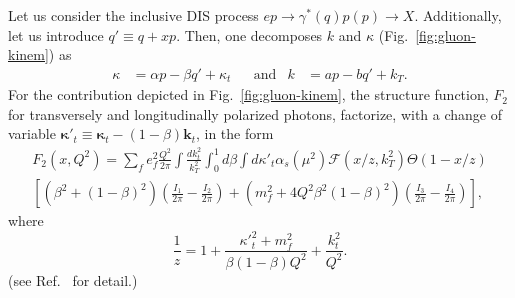 \documentclass[12pt]{article}
\numberwithin{equation}{section}
\numberwithin{table}{section}
\numberwithin{figure}{section}
\begin{document}
Let us consider the inclusive DIS process $e p\rightarrow \gamma^* (q) p(p)\rightarrow X$. %
Additionally, let us introduce $q'\equiv q+x p$. 
Then, one  decomposes $k$ and $\kappa$ (Fig.~\ref{fig:gluon-kinem}) as
\begin{align}
    \kappa&=\alpha p-\beta q'+\kappa_t&&\mathrm{and}& k&=a p- bq'+k_T.
\end{align}
For the contribution depicted in Fig.~\ref{fig:gluon-kinem}, the structure function, $F_2$ for transversely and longitudinally polarized photons, factorize, with a change of variable  ${\boldsymbol{\kappa}'}_t\equiv{\boldsymbol{\kappa}_t}-(1-\beta)\mathbf{k}_t$, in the form~\cite{ Kimber:2001uaa,Kwiecinski:1997ee}
\begin{multline}
	F_2(x,Q^2)=\sum_f e_f^2 \frac{Q^2}{2\pi}\int\frac{dk^2_t}{k_T^2}\int^1_0d\beta\int d{\kappa'}_t\alpha_s(\mu^2) \mathcal{F}(x/z,k_T^2)\Theta(1-x/z)\\
	\left[\left(\beta^2+(1-\beta)^2\right)\left(\frac{I_1}{2\pi}-\frac{I_2}{2\pi}\right)
	+\left(m_f^2+4Q^2\beta^2(1-\beta)^2\right)\left(\frac{I_3}{2\pi}-\frac{I_4}{2\pi}\right)\right],
	\label{eq:angle-integrated}
\end{multline}
where
\begin{equation}
	\frac{1}{z}=1+\frac{{\kappa'}^2_t+m_f^2}{\beta(1-\beta)Q^2}+\frac{k^2_t}{Q^2}.
	\label{eq:z}
\end{equation}
(see Ref.~\cite{ Kimber:2001uaa,Kwiecinski:1997ee} for detail.)
\end{document}
